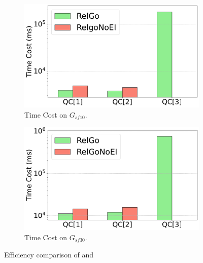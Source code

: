 \begin{figure}[ht]
    \vspace{-1em}
    \centering
    \begin{subfigure}[b]{.45\linewidth}
        \centering
        \includegraphics[width=\linewidth]{./figures/exp/ablation_ei_sf10.pdf}
        \vspace{-1.5em}
        \caption{Time Cost on $G_{sf10}$.}
        \label{fig:exp-expand-intersect-sf10}
    \end{subfigure}
    \begin{subfigure}[b]{0.45\linewidth}
        \centering
        \includegraphics[width=\linewidth]{./figures/exp/ablation_ei_sf30.pdf}
        \vspace{-1.5em}
        \caption{Time Cost on $G_{sf30}$.}
        \label{fig:exp-expand-intersect-sf30}
    \end{subfigure}
    \caption{Efficiency comparison of \name and \relgomj}
    \label{fig:exp-expand-intersect}
\end{figure}


